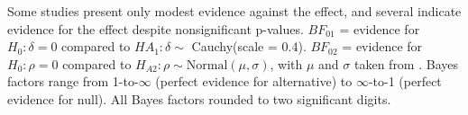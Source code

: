 \documentclass[man]{apa6}
\begin{document}
\begin{table}
\vspace{4mm}
Some studies present only modest evidence against the effect, and several indicate evidence for the effect despite nonsignificant p-values. $BF_{01}$ = evidence for $H_0: \delta = 0$ compared to $HA_1: \delta \sim$ Cauchy(scale = 0.4). $BF_{02}$ = evidence for $H_0: \rho = 0$ compared to $H_{A2}: \rho \sim \mbox{Normal}(\mu, \sigma)$, with $\mu$ and $\sigma$ taken from \citet{Anderson:etal:2010}. Bayes factors range from 1-to-$\infty$ (perfect evidence for alternative) to $\infty$-to-1 (perfect evidence for null). All Bayes factors rounded to two significant digits.
\label{mainStudyResults}
\end{table}

\begin{table}
\label{ElsonCRTTHacking}
\end{table}

\newpage


\end{document}
